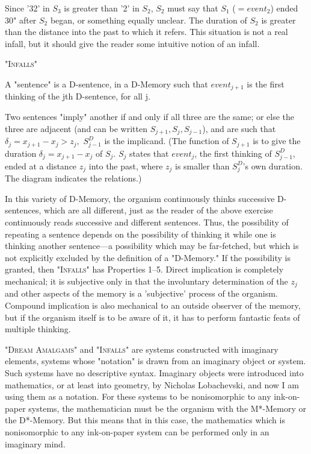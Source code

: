 Since '32' in $S_3$ is greater than '2' in $S_2$, $S_2$ must say that $S_1$ ($=event_2$)
ended 30" after $S_2$ began, or something equally unclear. The duration of $S_2$
is greater than the distance into the past to which it refers. This situation is 
not a real infall, but it should give the reader some intuitive notion of an 
infall. 


\newcommand{\midheading}[1]{
	{ \centering \large \textsc{#1} \par}}

\midheading{"Infalls"}

\begin{sysrules}
	A "sentence" is a D-sentence, in a D-Memory such that $event_{j+1}$ is the first 
thinking of the jth D-sentence, for all j. 

Two sentences "imply" another if and only if all three are the same; or else 
the three are adjacent (and can be written $S_{j+1},S_j,S_{j-1}$), and are such 
that $\delta_j=x_{j+1}-x_j> z_j,$ $S^D_{j-1}$ is the implicand. (The function of $S_{j+1}$ is to 
give the duration $\delta_j=x_{j+1}-x_j$ of $S_j$. $S_j$ states that $event_j$, the first 
thinking of $S^{D}_{j-1}$, ended at a distance $z_j$ into the past, where $z_j$ is smaller 
than $S^D_j$'s own duration. The diagram indicates the relations.) 
\end{sysrules}


In this variety of D-Memory, the organism continuously thinks successive 
D-sentences, which are all different, just as the reader of the above exercise 
continuously reads successive and different sentences. Thus, the possibility 
of repeating a sentence depends on the possibility of thinking it while one is 
thinking another sentence---a possibility which may be far-fetched, but which 
is not explicitly excluded by the definition of a "D-Memory." If the 
possibility is granted, then "\textsc{Infalls}" has Properties 1--5. Direct implication is 
completely mechanical; it is subjective only in that the involuntary 
determination of the $z_j$ and other aspects of the memory is a 'subjective' 
process of the organism. Compound implication is also mechanical to an 
outside observer of the memory, but if the organism itself is to be aware of 
it, it has to perform fantastic feats of multiple thinking. 

"\textsc{Dream Amalgams}" and "\textsc{Infalls}" are systems constructed with 
imaginary elements, systems whose "notation" is drawn from an imaginary 
object or system. Such systems have no descriptive syntax. Imaginary objects 
were introduced into mathematics, or at least into geometry, by Nicholas 
Lobachevski, and now I am using them as a notation. For these systems to 
be nonisomorphic to any ink-on-paper systems, the mathematician must be 
the organism with the M*-Memory or the D*-Memory. But this means that 
in this case, the mathematics which is nonisomorphic to any ink-on-paper 
system can be performed only in an imaginary mind. 

